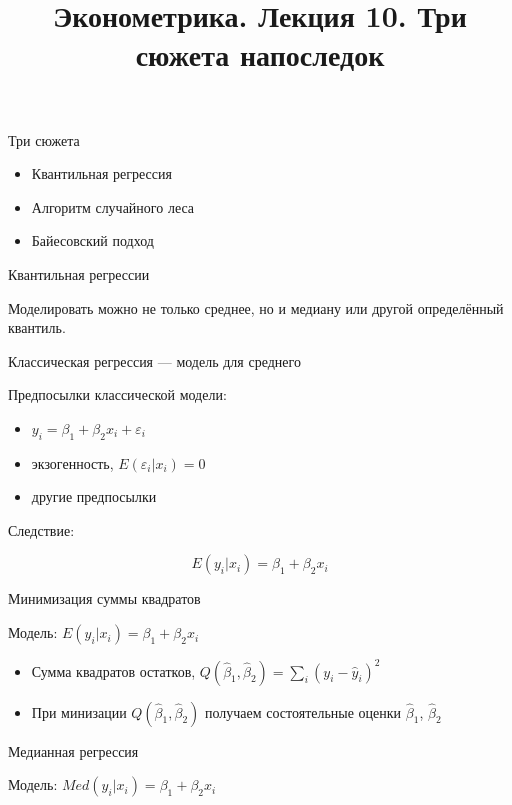 \documentclass[ignorenonframetext,]{beamer}
\title{Эконометрика. Лекция 10. Три сюжета напоследок}
\date{}
\newcommand{\e}{\varepsilon}
\newcommand{\hy}{\hat{y}}
\newcommand{\hb}{\hat{\beta}}
\begin{document}
\frame{\titlepage}

\begin{frame}{Три сюжета}

\begin{itemize}
\item
  Квантильная регрессия
\item
  Алгоритм случайного леса
\item
  Байесовский подход
\end{itemize}

\end{frame}

\begin{frame}{Квантильная регрессии}

Моделировать можно не только среднее, но и медиану или другой
определённый квантиль.

\end{frame}

\begin{frame}{Классическая регрессия --- модель для среднего}

Предпосылки классической модели:

\begin{itemize}
\item
  \(y_i=\beta_1 + \beta_2 x_i + \e_i\)
\item
  экзогенность, \(E(\e_i | x_i)=0\)
\item
  другие предпосылки
\end{itemize}

Следствие:

\[
E(y_i|x_i)=\beta_1 + \beta_2 x_i
\]

\end{frame}

\begin{frame}{Минимизация суммы квадратов}

Модель: \(E(y_i|x_i)=\beta_1 + \beta_2 x_i\)

\begin{itemize}
\item
  Сумма квадратов остатков, \(Q(\hb_1,\hb_2)=\sum_i (y_i - \hy_i)^2\)
\item
  При минизации \(Q(\hb_1,\hb_2)\) получаем состоятельные оценки
  \(\hb_1\), \(\hb_2\)
\end{itemize}

\end{frame}

\begin{frame}{Медианная регрессия}

Модель: \(Med(y_i|x_i)=\beta_1 + \beta_2 x_i\)

\end{frame}
\end{document}
